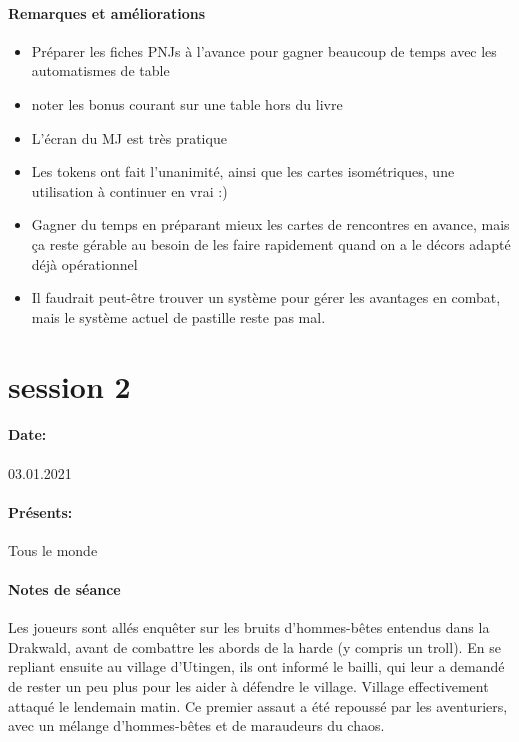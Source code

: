 \documentclass[10pt,a4paper]{book}
\begin{document}
\paragraph{Remarques et améliorations} 
\begin{itemize}
\item Préparer les fiches PNJs à l'avance pour gagner beaucoup de temps avec les automatismes de table
\item noter les bonus courant sur une table hors du livre
\item L'écran du MJ est très pratique
\item Les tokens ont fait l'unanimité, ainsi que les cartes isométriques, une utilisation à continuer en vrai :)
\item Gagner du temps en préparant mieux les cartes de rencontres en avance, mais ça reste gérable au besoin de les faire rapidement quand on a le décors adapté déjà opérationnel
\item Il faudrait peut-être trouver un système pour gérer les avantages en combat, mais le système actuel de pastille reste pas mal.
\end{itemize}
\section{session 2}
\paragraph{Date:} 03.01.2021
\paragraph{Présents:}Tous le monde
\paragraph{Notes de séance}
Les joueurs sont allés enquêter sur les bruits d'hommes-bêtes entendus dans la Drakwald, avant de combattre les abords de la harde (y compris un troll). En se repliant ensuite au village d'Utingen, ils ont informé le bailli, qui leur a demandé de rester un peu plus pour les aider à défendre le village. Village effectivement attaqué le lendemain matin. Ce premier assaut a été repoussé par les aventuriers, avec un mélange d'hommes-bêtes et de maraudeurs du chaos.
\end{document}
